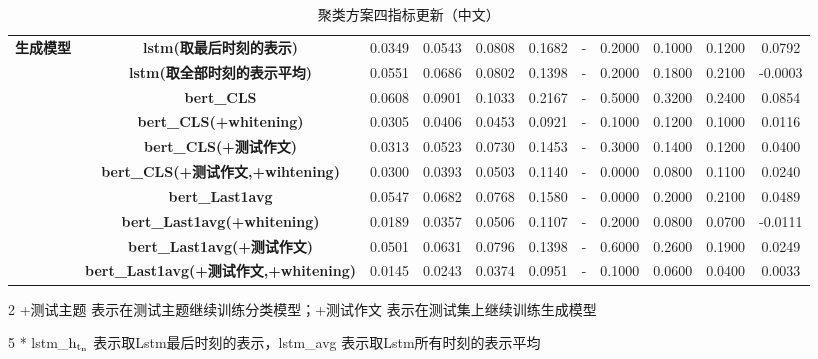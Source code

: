 \documentclass[11pt]{article}
\begin{document}
\begin{CJK}{UTF8}{gkai}
\begin{table}[htbp]
{\begin{tabular}{c|c|ccccccccc}
      \hline
      \multirow{10}[0]{*}{\textbf{生成模型}} & \textbf{lstm(取最后时刻的表示)} & 0.0349  & 0.0543  & 0.0808  & 0.1682  & -     & 0.2000  & 0.1000  & 0.1200  & 0.0792  \\
      & \textbf{lstm(取全部时刻的表示平均)} & 0.0551  & 0.0686  & 0.0802  & 0.1398  & -     & 0.2000  & 0.1800  & 0.2100  & -0.0003  \\
      \cline{2-11}
      & \textbf{bert\_CLS} & 0.0608  & 0.0901  & 0.1033  & 0.2167  & -     & 0.5000  & 0.3200  & 0.2400  & 0.0854  \\
      & \textbf{bert\_CLS(+whitening)} & 0.0305  & 0.0406  & 0.0453  & 0.0921  & -     & 0.1000  & 0.1200  & 0.1000  & 0.0116  \\
      & \textbf{bert\_CLS(+测试作文)} & 0.0313  & 0.0523  & 0.0730  & 0.1453  & -     & 0.3000  & 0.1400  & 0.1200  & 0.0400  \\
      & \textbf{bert\_CLS(+测试作文,+wihtening)} & 0.0300  & 0.0393  & 0.0503  & 0.1140  & -     & 0.0000  & 0.0800  & 0.1100  & 0.0240  \\
      \cline{2-11}
      & \textbf{bert\_Last1avg} & 0.0547  & 0.0682  & 0.0768  & 0.1580  & -     & 0.0000  & 0.2000  & 0.2100  & 0.0489  \\
      & \textbf{bert\_Last1avg(+whitening)} & 0.0189  & 0.0357  & 0.0506  & 0.1107  & -     & 0.2000  & 0.0800  & 0.0700  & -0.0111  \\
      & \textbf{bert\_Last1avg(+测试作文)} & 0.0501  & 0.0631  & 0.0796  & 0.1398  & -     & 0.6000  & 0.2600  & 0.1900  & 0.0249  \\
      & \textbf{bert\_Last1avg(+测试作文,+whitening)} & 0.0145  & 0.0243  & 0.0374  & 0.0951  & -     & 0.1000  & 0.0600  & 0.0400  & 0.0033  \\
      \hline
    \end{tabular}}%
    \begin{tablenotes}    %
      \footnotesize               %
      \item[2] +测试主题 表示在测试主题继续训练分类模型；+测试作文 表示在测试集上继续训练生成模型
      \item[5] * lstm\_$\rm h_{t_n}$ 表示取Lstm最后时刻的表示，lstm\_avg 表示取Lstm所有时刻的表示平均 
    \end{tablenotes} 
    \caption{聚类方案四指标更新（中文）}
  \label{tab:addlabel}%
\end{table}%



\end{CJK}
\end{document}
